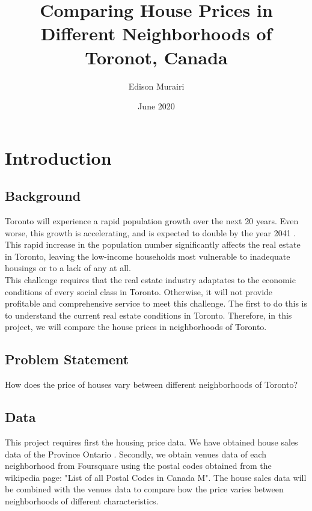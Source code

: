 \documentclass{article}
\title{Comparing House Prices in Different Neighborhoods of Toronot, Canada}
\author{Edison Murairi }
\date{June 2020}
\begin{document}
\maketitle

\section{Introduction}
\subsection{Background}
Toronto will experience a rapid population growth over the next 20 years. Even worse, this growth is accelerating, and is expected to double by the year 2041 \cite{toronto}. This rapid increase in the population number significantly affects the real estate in Toronto, leaving the low-income households most vulnerable to inadequate housings or to a lack of any at all. \\

This challenge requires that the real estate industry adaptates  to the economic conditions of every social class in Toronto. Otherwise, it will not provide profitable and comprehensive service to meet this challenge. The first to do this is to understand the current real estate conditions in Toronto. Therefore, in this project, we will compare the house prices in neighborhoods of Toronto. 

\subsection{Problem Statement}
How does the price of houses vary between different neighborhoods of Toronto?

\subsection{Data}
This project requires first the housing price data. We have obtained house sales data of the Province Ontario \cite{houses_sale}. Secondly, we obtain venues data of each neighborhood from Foursquare using the postal codes obtained from the wikipedia page: "List of all Postal Codes in Canada M". The house sales data will be combined with the venues data to compare how the price varies between neighborhoods of different characteristics.





\end{document}
